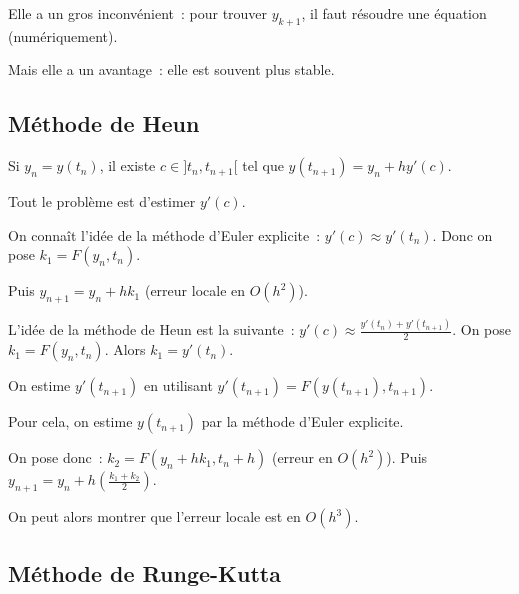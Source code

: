 Elle a un gros inconvénient~: pour trouver $y_{k+1}$, il faut résoudre une équation
(numériquement).

Mais elle a un avantage~: elle est souvent plus stable.

\subsection{Méthode de Heun}

Si $y_{n} = y(t_{n})$, il existe $c\in]t_{n},t_{n+1}[$ tel que
$ y(t_{n+1}) = y_{n} + hy'(c) $.

Tout le problème est d'estimer $y'(c)$.


On connaît l'idée de la méthode d'Euler explicite~: $
  y'(c)\approx y'(t_{n})
$. 
Donc on pose $\boxed{k_{1}=F(y_{n},t_{n})}$.

Puis
$
  \boxed{y_{n+1} = y_{n} + hk_{1}}
$ (erreur locale en $O(h^{2})$).

L'idée de la méthode de Heun est la suivante~:
$  y'(c)\approx \frac{y'(t_{n})+y'(t_{n+1})}{2}$.
On pose $\boxed{k_{1} = F(y_{n},t_{n})}$.
Alors $k_{1} = y'(t_{n})$.

On estime $y'(t_{n+1})$ en utilisant $y'(t_{n+1}) = F(y(t_{n+1}),
t_{n+1})$.

Pour cela, on estime $y(t_{n+1})$ par la méthode d'Euler
explicite.

On pose donc~: $\boxed{k_{2} = F(y_{n}+hk_{1},t_{n}+h)}$ (erreur en $O(h^{2})$).
Puis $  \boxed{y_{n+1} = y_{n} + h
\left(
  \frac{k_{1}+k_{2}}{2}
\right)}$.


On peut alors montrer que l'erreur locale est en $O(h^{3})$.


\subsection{Méthode de Runge-Kutta}

